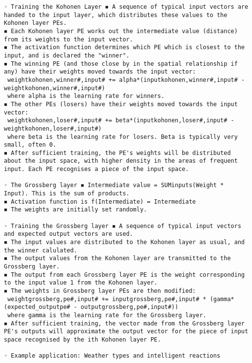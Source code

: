 \documentclass[a4paper,11pt]{report}
\begin{document}
\begin{verbatim}
◦ Training the Kohonen Layer ◾ A sequence of typical input vectors are handed to the input layer, which distributes these values to the Kohonen layer PEs. 
◾ Each Kohonen layer PE works out the intermediate value (distance) from its weights to the input vector. 
◾ The activation function determines which PE which is closest to the input, and is declared the "winner". 
◾ The winning PE (and those close by in the spatial relationship if any) have their weights moved towards the input vector:
 weightkohonen,winner#,input# += alpha*(inputkohonen,winner#,input# - weightkohonen,winner#,input#)
 where alpha is the learning rate for winners. 
◾ The other PEs (losers) have their weights moved towards the input vector:
 weightkohonen,loser#,input# += beta*(inputkohonen,loser#,input# - weightkohonen,loser#,input#)
 where beta is the learning rate for losers. Beta is typically very small, often 0. 
◾ After sufficient training, the PE's weights will be distributed about the input space, with higher density in the areas of frequent input. Each PE recognises a piece of the input space. 

◦ The Grossberg layer ◾ Intermediate value = SUMinputs(Weight * Input). This is the sum of products. 
◾ Activation function is f(Intermediate) = Intermediate 
◾ The weights are initially set randomly. 

◦ Training the Grossberg layer ◾ A sequence of typical input vectors and expected output vectors are used. 
◾ The input values are distributed to the Kohonen layer as usual, and the winner calulated. 
◾ The output values from the Kohonen layer are transmitted to the Grossberg layer. 
◾ The output from each Grossberg layer PE is the weight corresponding to the input value 1 from the Kohonen layer. 
◾ The weights in Grossberg layer PEs are then modified:
 weightgrossberg,pe#,input# += inputgrossberg,pe#,input# * (gamma*(expected_outputpe# - outputgrossberg,pe#,input#))
 where gamma is the learning rate for the Grossberg layer. 
◾ After sufficient training, the vector made from the Grossberg layer PE's outputs will approximate the output vector for the piece of input space recognised by the ith Kohonen layer PE. 

◦ Example application: Weather types and intelligent reactions 




\end{verbatim}
\end{document}
